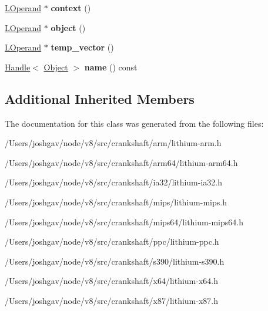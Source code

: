 \begin{DoxyCompactItemize}
\item 
\hyperlink{classv8_1_1internal_1_1_l_operand}{L\+Operand} $\ast$ {\bfseries context} ()\hypertarget{classv8_1_1internal_1_1_l_load_named_generic_a61d03d8bff411819ec103caee4b20d95}{}\label{classv8_1_1internal_1_1_l_load_named_generic_a61d03d8bff411819ec103caee4b20d95}

\item 
\hyperlink{classv8_1_1internal_1_1_l_operand}{L\+Operand} $\ast$ {\bfseries object} ()\hypertarget{classv8_1_1internal_1_1_l_load_named_generic_ac545174d6ce0223254278aa25992bcf1}{}\label{classv8_1_1internal_1_1_l_load_named_generic_ac545174d6ce0223254278aa25992bcf1}

\item 
\hyperlink{classv8_1_1internal_1_1_l_operand}{L\+Operand} $\ast$ {\bfseries temp\+\_\+vector} ()\hypertarget{classv8_1_1internal_1_1_l_load_named_generic_ac71e90a4f4d755276a1d76ac24d4ef3d}{}\label{classv8_1_1internal_1_1_l_load_named_generic_ac71e90a4f4d755276a1d76ac24d4ef3d}

\item 
\hyperlink{classv8_1_1internal_1_1_handle}{Handle}$<$ \hyperlink{classv8_1_1internal_1_1_object}{Object} $>$ {\bfseries name} () const \hypertarget{classv8_1_1internal_1_1_l_load_named_generic_a328fcd03d981c29639521ee005f3adc7}{}\label{classv8_1_1internal_1_1_l_load_named_generic_a328fcd03d981c29639521ee005f3adc7}

\end{DoxyCompactItemize}
\subsection*{Additional Inherited Members}


The documentation for this class was generated from the following files\+:\begin{DoxyCompactItemize}
\item 
/\+Users/joshgav/node/v8/src/crankshaft/arm/lithium-\/arm.\+h\item 
/\+Users/joshgav/node/v8/src/crankshaft/arm64/lithium-\/arm64.\+h\item 
/\+Users/joshgav/node/v8/src/crankshaft/ia32/lithium-\/ia32.\+h\item 
/\+Users/joshgav/node/v8/src/crankshaft/mips/lithium-\/mips.\+h\item 
/\+Users/joshgav/node/v8/src/crankshaft/mips64/lithium-\/mips64.\+h\item 
/\+Users/joshgav/node/v8/src/crankshaft/ppc/lithium-\/ppc.\+h\item 
/\+Users/joshgav/node/v8/src/crankshaft/s390/lithium-\/s390.\+h\item 
/\+Users/joshgav/node/v8/src/crankshaft/x64/lithium-\/x64.\+h\item 
/\+Users/joshgav/node/v8/src/crankshaft/x87/lithium-\/x87.\+h\end{DoxyCompactItemize}
